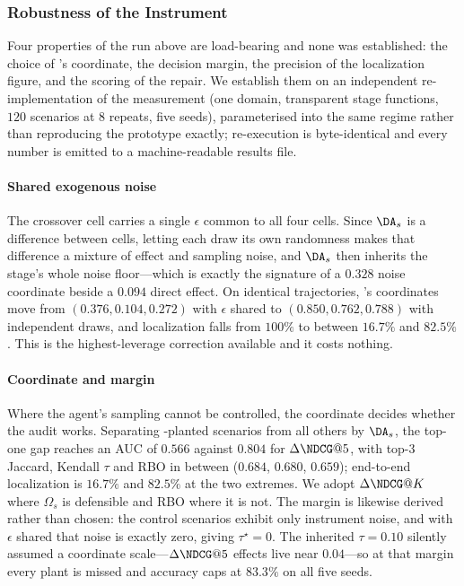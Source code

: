 \subsubsection{Robustness of the Instrument}
\label{sec:scaff-robustness}

Four properties of the run above are load-bearing and none was established: the choice of
's coordinate, the decision margin, the precision of the localization figure, and the
scoring of the repair. We establish them on an independent re-implementation of the measurement
(one domain, transparent stage functions, $120$ scenarios at $8$ repeats, five seeds),
parameterised into the same regime rather than reproducing the prototype exactly; re-execution is
byte-identical and every number is emitted to a machine-readable results file.

\paragraph{Shared exogenous noise}
The crossover cell carries a single $\epsilon$ common to all four cells. Since $\DA_s$ is a
difference between cells, letting each draw its own randomness makes that difference a mixture of
effect and sampling noise, and $\DA_s$ then inherits the stage's whole noise floor---which is
exactly the signature of a $0.328$ noise coordinate beside a $0.094$ direct effect. On identical
trajectories, 's coordinates move from $(0.376, 0.104, 0.272)$ with $\epsilon$ shared
to $(0.850, 0.762, 0.788)$ with independent draws, and localization falls from $100\%$ to between
$16.7\%$ and $82.5\%$. This is the highest-leverage correction available and it costs nothing.

\paragraph{Coordinate and margin}
Where the agent's sampling cannot be controlled, the coordinate decides whether the audit works.
Separating -planted scenarios from all others by $\DA_s$, the top-one gap reaches an
AUC of $0.566$ against $0.804$ for $\Delta\NDCG@5$, with top-3 Jaccard, Kendall $\tau$ and RBO in
between ($0.684$, $0.680$, $0.659$); end-to-end localization is $16.7\%$ and $82.5\%$ at the two
extremes. We adopt $\Delta\NDCG@K$ where $\Omega_s$ is defensible and RBO where it is not.
The margin is likewise derived rather than chosen: the control scenarios exhibit only instrument
noise, and with $\epsilon$ shared that noise is exactly zero, giving $\tau^\star = 0$. The
inherited $\tau = 0.10$ silently assumed a coordinate scale---$\Delta\NDCG@5$ effects live near
$0.04$---so at that margin every  plant is missed and accuracy caps at $83.3\%$ on all
five seeds.

